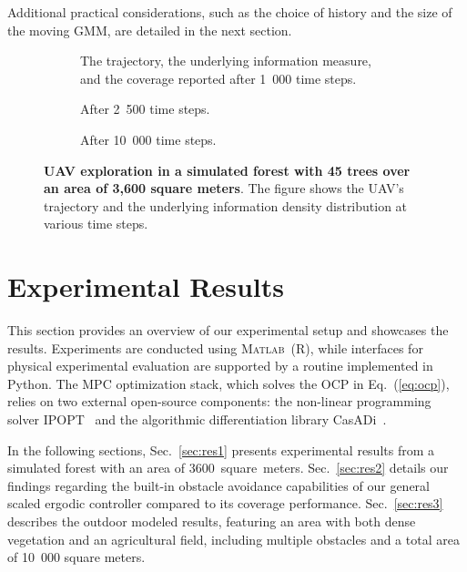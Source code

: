 \documentclass[letterpaper,10pt,conference,twoside]{IEEEtran}
\theoremstyle{definition}
\begin{document}
Additional practical considerations, such as the choice of history and the size of the moving GMM, are detailed in the next section.



\begin{figure}[t!]
  \centering
  \vspace*{-.3cm}
  \begin{subfigure}[t]{\linewidth}
  \hspace*{-.15cm}
  \caption{The trajectory, the underlying information measure, and the coverage reported after 1~000 time steps.}
  \label{fig:1-1}
  \end{subfigure}
  \begin{subfigure}[t]{\linewidth}
  \hspace*{-.15cm}
  \caption{After 2~500 time steps.}
  \label{fig:1-2}
  \end{subfigure}
  \begin{subfigure}[t]{\linewidth}
  \hspace*{-.15cm}
  \caption{After 10~000 time steps.}
  \label{fig:1-3}
  \end{subfigure}
  \caption{\textbf{UAV exploration in a simulated forest with 45 trees over an area of 3,600 square meters}. The figure shows the UAV's trajectory and the underlying information density distribution at various time steps.}
  \label{fig:1}
\end{figure}


\section{Experimental Results}\label{sec:res}
\noindent
This section provides an overview of our experimental setup and showcases the results. 
Experiments are conducted using \textsc{Matlab}~(R), while interfaces for physical experimental evaluation are supported by a routine implemented in Python. The MPC optimization stack, which solves the OCP in Eq.~(\ref{eq:ocp}), relies on two external open-source components: the non-linear programming solver IPOPT~\cite{wachter2006implementation} and the algorithmic differentiation library CasADi~\cite{andersson2012casadi}.

In the following sections, Sec.~\ref{sec:res1} presents experimental results from a simulated forest with an area of 3600~square~meters. Sec.~\ref{sec:res2} details our findings regarding the built-in obstacle avoidance capabilities of our general scaled ergodic controller compared to its coverage performance. Sec.~\ref{sec:res3} describes the outdoor modeled results, featuring an area with both dense vegetation and an agricultural field, including multiple obstacles and a total area of 10~000 square meters.
\end{document}
